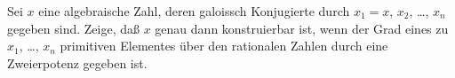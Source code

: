 \documentclass{algsheet}
\author{Dipl.-Math.~Arturo Mancino}
\date{26.~Januar 2011}
\begin{document}
                \maketitle



\begin{exercise}
    Sei \(x\) eine algebraische Zahl, deren galoissch Konjugierte
    durch \(x_1 = x\), \(x_2\), \dots, \(x_n\) gegeben sind. Zeige, daß
    \(x\) genau dann konstruierbar ist, wenn der Grad eines zu
    \(x_1\), \dots, \(x_n\) primitiven Elementes über den rationalen Zahlen
    durch eine Zweierpotenz gegeben ist.
\end{exercise}
\end{document}
